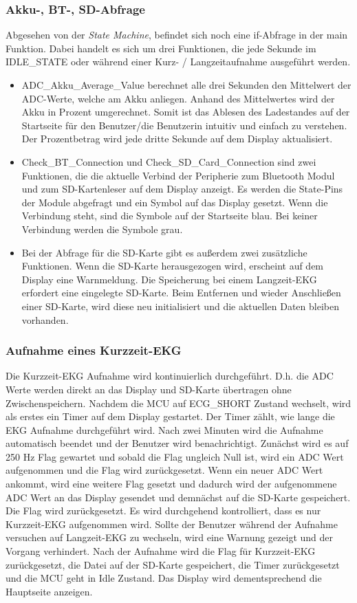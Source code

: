 \subsubsection{Akku-, BT-, SD-Abfrage}

Abgesehen von der \textit{State Machine}, befindet sich noch eine if-Abfrage in der main Funktion. Dabei handelt es sich um drei Funktionen, die jede Sekunde im IDLE\_STATE oder während einer Kurz- / Langzeitaufnahme ausgeführt werden.
\begin{itemize}
    \item ADC\_Akku\_Average\_Value berechnet alle drei Sekunden den Mittelwert der ADC-Werte, welche am Akku anliegen. Anhand des Mittelwertes wird der Akku in Prozent umgerechnet. Somit ist das Ablesen des Ladestandes auf der Startseite für den Benutzer/die Benutzerin intuitiv und einfach zu verstehen.
    Der Prozentbetrag wird jede dritte Sekunde auf dem Display aktualisiert.
    \item Check\_BT\_Connection und Check\_SD\_Card\_Connection sind zwei Funktionen, die die aktuelle Verbind der Peripherie zum Bluetooth Modul und zum SD-Kartenleser auf dem Display anzeigt. Es werden die State-Pins der Module abgefragt und ein Symbol auf das Display gesetzt. Wenn die Verbindung steht, sind die Symbole auf der Startseite blau. Bei keiner Verbindung werden die Symbole grau.
    \item Bei der Abfrage für die SD-Karte gibt es außerdem zwei zusätzliche Funktionen. Wenn die SD-Karte herausgezogen wird, erscheint auf dem Display eine Warnmeldung. Die Speicherung bei einem Langzeit-EKG erfordert eine eingelegte SD-Karte. Beim Entfernen und wieder Anschließen einer SD-Karte, wird diese neu initialisiert und die aktuellen Daten bleiben vorhanden.
\end{itemize}

\subsubsection{Aufnahme eines Kurzzeit-EKG}

Die Kurzzeit-EKG Aufnahme wird kontinuierlich durchgeführt. D.h. die ADC Werte werden direkt an das Display und SD-Karte übertragen ohne Zwischenspeichern. Nachdem die MCU auf ECG\_SHORT Zustand wechselt, wird als erstes ein Timer auf dem Display gestartet. Der Timer zählt, wie lange die EKG Aufnahme durchgeführt wird. Nach zwei Minuten wird die Aufnahme automatisch beendet und der Benutzer wird benachrichtigt. Zunächst wird es auf 250 Hz Flag gewartet und sobald die Flag ungleich Null ist, wird ein ADC Wert aufgenommen und die Flag wird zurückgesetzt. Wenn ein neuer ADC Wert ankommt, wird eine weitere Flag gesetzt und dadurch wird der aufgenommene ADC Wert an das Display gesendet und demnächst auf die SD-Karte gespeichert. Die Flag wird zurückgesetzt.
Es wird durchgehend kontrolliert, dass es nur Kurzzeit-EKG aufgenommen wird. Sollte der Benutzer während der Aufnahme versuchen auf Langzeit-EKG zu wechseln, wird eine Warnung gezeigt und der Vorgang verhindert.
Nach der Aufnahme wird die Flag für Kurzzeit-EKG zurückgesetzt, die Datei auf der SD-Karte gespeichert, die Timer zurückgesetzt und die MCU geht in Idle Zustand. Das Display wird dementsprechend die Hauptseite anzeigen.

